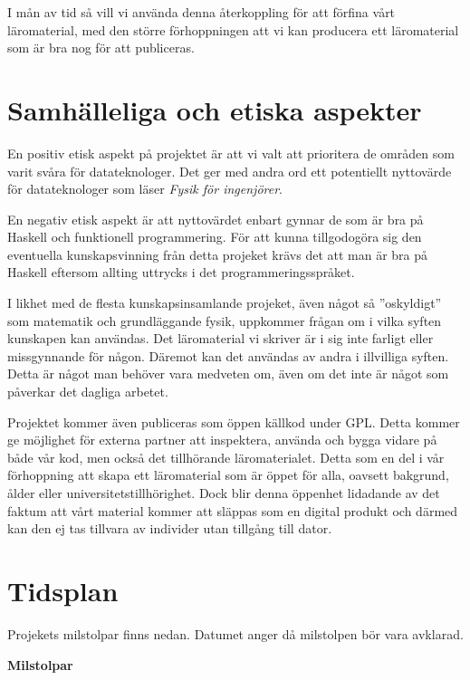 \documentclass[12pt,a4paper]{article}
\begin{document}
I mån av tid så vill vi använda denna återkoppling för att förfina vårt
läromaterial, med den större förhoppningen att vi kan producera ett läromaterial
som är bra nog för att publiceras.

\section{Samhälleliga och etiska aspekter}

En positiv etisk aspekt på projektet är att vi valt att prioritera de områden
som varit svåra för datateknologer. Det ger med andra ord ett potentiellt
nyttovärde för datateknologer som läser \textit{Fysik för ingenjörer}.

En negativ etisk aspekt är att nyttovärdet enbart gynnar de som är bra på
Haskell och funktionell programmering. För att kunna tillgodogöra sig den
eventuella kunskapsvinning från detta projeket krävs det att man är bra på
Haskell eftersom allting uttrycks i det programmeringsspråket.

I likhet med de flesta kunskapsinsamlande projeket, även något så ''oskyldigt''
som matematik och grundläggande fysik, uppkommer frågan om i vilka syften
kunskapen kan användas. Det läromaterial vi skriver är i sig inte farligt eller
missgynnande för någon. Däremot kan det användas av andra i illvilliga syften.
Detta är något man behöver vara medveten om, även om det inte är något som
påverkar det dagliga arbetet.

Projektet kommer även publiceras som öppen källkod under GPL\cite{GPL}.  Detta
kommer ge möjlighet för externa partner att inspektera, använda och bygga vidare
på både vår kod, men också det tillhörande läromaterialet. Detta som en del i
vår förhoppning att skapa ett läromaterial som är öppet för alla, oavsett
bakgrund, ålder eller universitetstillhörighet. Dock blir denna öppenhet
lidadande av det faktum att vårt material kommer att släppas som en digital
produkt och därmed kan den ej tas tillvara av individer utan tillgång till
dator. 

\section{Tidsplan}

Projekets milstolpar finns nedan. Datumet anger då milstolpen bör vara avklarad.

\textbf{Milstolpar}
\end{document}
